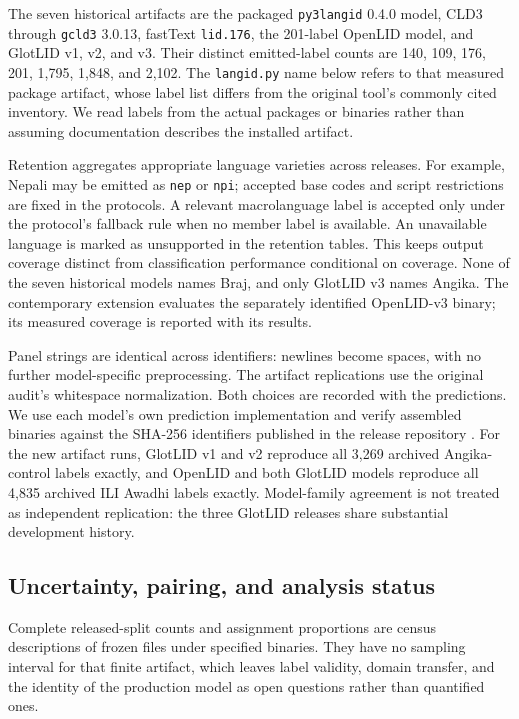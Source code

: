\documentclass[final]{clv2025}
\newcommand{\lab}[1]{\texttt{#1}}
\begin{document}
The seven historical artifacts are the packaged \texttt{py3langid} 0.4.0 model, CLD3 through \texttt{gcld3} 3.0.13, fastText \lab{lid.176}, the 201-label OpenLID model, and GlotLID v1, v2, and v3. Their distinct emitted-label counts are 140, 109, 176, 201, 1,795, 1,848, and 2,102. The \texttt{langid.py} name below refers to that measured package artifact, whose label list differs from the original tool's commonly cited inventory. We read labels from the actual packages or binaries rather than assuming documentation describes the installed artifact.

Retention aggregates appropriate language varieties across releases. For example, Nepali may be emitted as \lab{nep} or \lab{npi}; accepted base codes and script restrictions are fixed in the protocols. A relevant macrolanguage label is accepted only under the protocol's fallback rule when no member label is available. An unavailable language is marked as unsupported in the retention tables. This keeps output coverage distinct from classification performance conditional on coverage. None of the seven historical models names Braj, and only GlotLID v3 names Angika. The contemporary extension evaluates the separately identified OpenLID-v3 binary; its measured coverage is reported with its results.

Panel strings are identical across identifiers: newlines become spaces, with no further model-specific preprocessing. The artifact replications use the original audit's whitespace normalization. Both choices are recorded with the predictions. We use each model's own prediction implementation and verify assembled binaries against the SHA-256 identifiers published in the release repository \citep{glotlidmodelcard}. For the new artifact runs, GlotLID v1 and v2 reproduce all 3,269 archived Angika-control labels exactly, and OpenLID and both GlotLID models reproduce all 4,835 archived ILI Awadhi labels exactly. Model-family agreement is not treated as independent replication: the three GlotLID releases share substantial development history.

\subsection{Uncertainty, pairing, and analysis status}\label{sec:uncertainty}

Complete released-split counts and assignment proportions are census descriptions of frozen files under specified binaries. They have no sampling interval for that finite artifact, which leaves label validity, domain transfer, and the identity of the production model as open questions rather than quantified ones.
\end{document}
